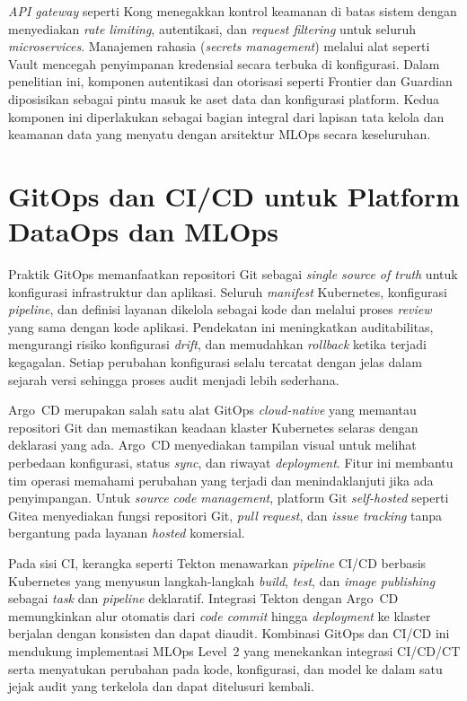 \textit{API gateway} seperti Kong \autocite{kong2025} menegakkan kontrol keamanan di batas sistem dengan menyediakan \textit{rate limiting}, autentikasi, dan \textit{request filtering} untuk seluruh \textit{microservices}. Manajemen rahasia (\textit{secrets management}) melalui alat seperti Vault \autocite{vault2025} mencegah penyimpanan kredensial secara terbuka di konfigurasi. Dalam penelitian ini, komponen autentikasi dan otorisasi seperti Frontier \autocite{raystack2025frontier} dan Guardian \autocite{raystack2025guardian} diposisikan sebagai pintu masuk ke aset data dan konfigurasi platform. Kedua komponen ini diperlakukan sebagai bagian integral dari lapisan tata kelola dan keamanan data yang menyatu dengan arsitektur MLOps secara keseluruhan.

\section{GitOps dan CI/CD untuk Platform DataOps dan MLOps}
\label{sec:gitops}

Praktik GitOps memanfaatkan repositori Git sebagai \textit{single source of truth} untuk konfigurasi infrastruktur dan aplikasi. Seluruh \textit{manifest} Kubernetes, konfigurasi \textit{pipeline}, dan definisi layanan dikelola sebagai kode dan melalui proses \textit{review} yang sama dengan kode aplikasi. Pendekatan ini meningkatkan auditabilitas, mengurangi risiko konfigurasi \textit{drift}, dan memudahkan \textit{rollback} ketika terjadi kegagalan. Setiap perubahan konfigurasi selalu tercatat dengan jelas dalam sejarah versi sehingga proses audit menjadi lebih sederhana.

Argo~CD merupakan salah satu alat GitOps \textit{cloud-native} yang memantau repositori Git dan memastikan keadaan klaster Kubernetes selaras dengan deklarasi yang ada. Argo~CD menyediakan tampilan visual untuk melihat perbedaan konfigurasi, status \textit{sync}, dan riwayat \textit{deployment}. Fitur ini membantu tim operasi memahami perubahan yang terjadi dan menindaklanjuti jika ada penyimpangan. Untuk \textit{source code management}, platform Git \textit{self-hosted} seperti Gitea \autocite{gitea2025} menyediakan fungsi repositori Git, \textit{pull request}, dan \textit{issue tracking} tanpa bergantung pada layanan \textit{hosted} komersial.

Pada sisi CI, kerangka seperti Tekton \autocite{tekton2024} menawarkan \textit{pipeline} CI/CD berbasis Kubernetes yang menyusun langkah-langkah \textit{build}, \textit{test}, dan \textit{image publishing} sebagai \textit{task} dan \textit{pipeline} deklaratif. Integrasi Tekton dengan Argo~CD memungkinkan alur otomatis dari \textit{code commit} hingga \textit{deployment} ke klaster berjalan dengan konsisten dan dapat diaudit. Kombinasi GitOps dan CI/CD ini mendukung implementasi MLOps Level~2 yang menekankan integrasi CI/CD/CT serta menyatukan perubahan pada kode, konfigurasi, dan model ke dalam satu jejak audit yang terkelola dan dapat ditelusuri kembali.


